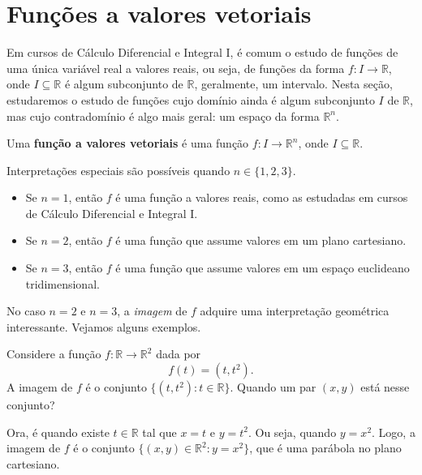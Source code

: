 \section{Funções a valores vetoriais}
Em cursos de Cálculo Diferencial e Integral I, é comum o estudo de funções de uma única variável real a valores reais, ou seja, de funções da forma $f:I\rightarrow \mathbb R$, onde $I\subseteq \mathbb R$ é algum subconjunto de $\mathbb R$, geralmente, um intervalo.
Nesta seção, estudaremos o estudo de funções cujo domínio ainda é algum subconjunto $I$ de $\mathbb R$, mas cujo contradomínio é algo mais geral: um espaço da forma $\mathbb R^n$.

\begin{definition}
    Uma \textbf{função a valores vetoriais} é uma função $f:I\rightarrow \mathbb R^n$, onde $I\subseteq \mathbb R$.
\end{definition}

Interpretações especiais são possíveis quando $n\in \{1, 2, 3\}$.
\begin{itemize}
    \item Se $n=1$, então $f$ é uma função a valores reais, como as estudadas em cursos de Cálculo Diferencial e Integral I.
    \item Se $n=2$, então $f$ é uma função que assume valores em um plano cartesiano.
    \item Se $n=3$, então $f$ é uma função que assume valores em um espaço euclideano tridimensional.
\end{itemize}

No caso $n=2$ e $n=3$, a \emph{imagem} de $f$ adquire uma interpretação geométrica interessante.
Vejamos alguns exemplos.

\begin{example}
    Considere a função $f:\mathbb R\rightarrow \mathbb R^2$ dada por
    \[
        f(t) = (t, t^2).
    \]
    A imagem de $f$ é o conjunto $\{(t, t^2):t\in \mathbb R\}$. Quando um par $(x, y)$ está nesse conjunto?

    Ora, é quando existe $t \in \mathbb R$ tal que $x=t$ e $y=t^2$.
    Ou seja, quando $y=x^2$.
    Logo, a imagem de $f$ é o conjunto $\{(x, y)\in \mathbb R^2:y=x^2\}$, que é uma parábola no plano cartesiano.
\end{example}

